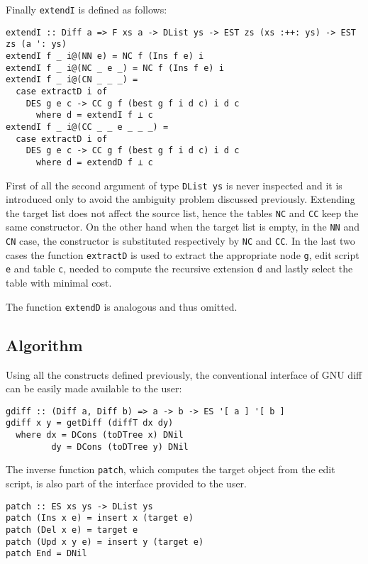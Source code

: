 \documentclass[../Thesis.tex]{subfiles}
\begin{document}
	Finally \texttt{extendI} is defined as follows:
	
\begin{verbatim}	
extendI :: Diff a => F xs a -> DList ys -> EST zs (xs :++: ys) -> EST zs (a ': ys)
extendI f _ i@(NN e) = NC f (Ins f e) i
extendI f _ i@(NC _ e _) = NC f (Ins f e) i
extendI f _ i@(CN _ _ _) =
  case extractD i of
    DES g e c -> CC g f (best g f i d c) i d c
      where d = extendI f ⊥ c
extendI f _ i@(CC _ _ e _ _ _) =
  case extractD i of
    DES g e c -> CC g f (best g f i d c) i d c
      where d = extendD f ⊥ c
\end{verbatim}

	First of all the second argument of type \texttt{DList ys} is never inspected
	and it is introduced only to avoid the ambiguity problem discussed 
	previously.
	Extending the target list does not affect the source list, hence
	the tables \texttt{NC} and \texttt{CC} keep the same constructor.
	On the other hand when the target list is empty, in the \texttt{NN} and
	\texttt{CN} case, the constructor is substituted respectively by
	\texttt{NC} and \texttt{CC}.
	In the last two cases the function \texttt{extractD} is used to extract
	the appropriate node \texttt{g}, edit script \texttt{e} and table
	\texttt{c}, needed to compute the recursive extension \texttt{d}
	and lastly select the table with minimal cost.
		
	The function \texttt{extendD} is analogous and thus omitted.

	\subsection{Algorithm}
	\label{subsec:HaskellAlgo}
	Using all the constructs defined previously, the conventional
	interface of GNU diff can be easily made available to the
	user:

\begin{verbatim}
gdiff :: (Diff a, Diff b) => a -> b -> ES '[ a ] '[ b ]
gdiff x y = getDiff (diffT dx dy)
  where dx = DCons (toDTree x) DNil
         dy = DCons (toDTree y) DNil
\end{verbatim}
	
	The inverse function \texttt{patch}, which computes the target
	object from the edit script, is also part of the interface
	provided to the user.

\begin{verbatim}
patch :: ES xs ys -> DList ys
patch (Ins x e) = insert x (target e)
patch (Del x e) = target e
patch (Upd x y e) = insert y (target e)
patch End = DNil
\end{verbatim}
\end{document}

